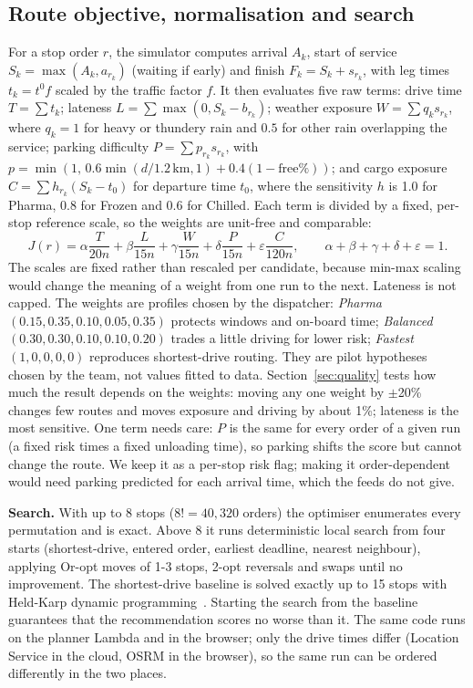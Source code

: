 \documentclass[10.5pt,a4paper]{article}
\begin{document}
\subsection{Route objective, normalisation and search}\label{sec:objective}
For a stop order $r$, the simulator computes arrival $A_k$, start of service $S_k=\max(A_k,a_{r_k})$ (waiting if early) and finish
$F_k=S_k+s_{r_k}$, with leg times $t_k=t^0 f$ scaled by the traffic factor $f$. It then evaluates five raw terms: drive time
$T=\sum t_k$; lateness $L=\sum\max(0,S_k-b_{r_k})$; weather exposure $W=\sum q_k s_{r_k}$, where $q_k=1$ for heavy or thundery
rain and $0.5$ for other rain overlapping the service; parking difficulty $P=\sum p_{r_k}s_{r_k}$, with
$p=\min(1,\,0.6\min(d/1.2\,\text{km},1)+0.4(1-\text{free}\%))$; and cargo exposure $C=\sum h_{r_k}(S_k-t_0)$ for departure time $t_0$, where the sensitivity
$h$ is 1.0 for Pharma, 0.8 for Frozen and 0.6 for Chilled. Each term is divided by a fixed,
per-stop reference scale, so the weights are unit-free and comparable:
\begin{equation}
J(r)=\alpha\frac{T}{20n}+\beta\frac{L}{15n}+\gamma\frac{W}{15n}+\delta\frac{P}{15n}+\varepsilon\frac{C}{120n},
\qquad \alpha+\beta+\gamma+\delta+\varepsilon=1 .
\end{equation}
The scales are fixed rather than rescaled per candidate, because min-max scaling would change the meaning of a weight from one run to the next. Lateness is not capped. The weights are
profiles chosen by the dispatcher: \emph{Pharma} $(0.15,0.35,0.10,0.05,0.35)$ protects windows and on-board time;
\emph{Balanced} $(0.30,0.30,0.10,0.10,0.20)$ trades a little driving for lower risk; \emph{Fastest} $(1,0,0,0,0)$ reproduces
shortest-drive routing. They are pilot hypotheses chosen by the team, not values fitted to data. Section~\ref{sec:quality} tests how much the result depends on the weights: moving any one weight by $\pm$20\% changes few routes and moves exposure and driving by about 1\%; lateness is the most sensitive. One term needs care:
$P$ is the same for every order of a given run (a fixed risk times a fixed unloading time), so parking shifts the score but
cannot change the route. We keep it as a per-stop risk flag; making it order-dependent would need parking predicted for each
arrival time, which the feeds do not give.

\textbf{Search.} With up to 8 stops ($8!=40{,}320$ orders) the optimiser enumerates every permutation and is exact. Above 8 it
runs deterministic local search from four starts (shortest-drive, entered order, earliest deadline, nearest neighbour), applying
Or-opt moves of 1-3 stops, 2-opt reversals and swaps until no improvement. The shortest-drive baseline is solved exactly up
to 15 stops with Held-Karp dynamic programming~\cite{heldkarp}. Starting the search from the baseline guarantees that the
recommendation scores no worse than it. The same code runs on the planner Lambda and in the browser; only the drive times
differ (Location Service in the cloud, OSRM in the browser), so the same run can be ordered differently in the two places.
\end{document}
